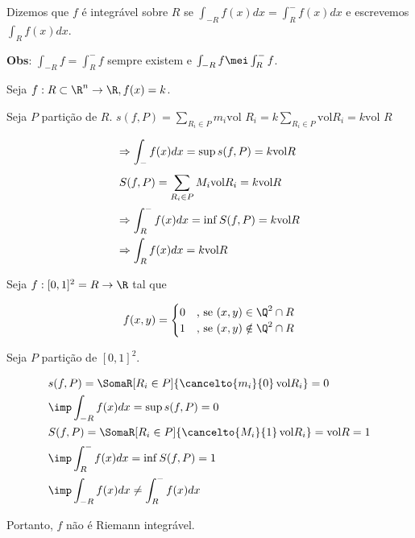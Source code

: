 \documentclass[11pt, oneside, a4paper]{gsm-l}
\begin{document}
Dizemos que $f$ é integrável sobre $R$ se $\int_{-R} {f(x)dx}  = \int_R^ -  {f(x)dx}$ e escrevemos $\int_R f(x) dx$.

\textbf{Obs}: $\int_{-R} f = \int_R^- f$ sempre existem e $\int_{-R} f \mei \int_R^- f$.

\begin{exem}
Seja $f:R \subset \R^n \to \R, f(x) = k$.

Seja $P$ partição de $R$. $s(f,P) = \sum\limits_{R_i \in P}^{} {m_i {\text{vol }}R_i} = k \sum\limits_{R_i \in P}^{} {{\text{vol}}R_i} = k \text{vol } R$

\[
\begin{gathered}
   \Rightarrow \int_ -  {f(x)dx}  = \sup s(f,P) = k{\text{vol}}R \hfill \\
  S(f,P) = \sum\limits_{R_i  \in P}^{} {M_i {\text{vol}}R_i }  = k{\text{vol}}R \hfill \\
   \Rightarrow \int_R^ -  {f(x)dx}  = \inf S(f,P) = k{\text{vol}}R \hfill \\
   \Rightarrow \int_R {f(x)dx}  = k{\text{vol}}R \hfill \\ 
\end{gathered} 
\]

\end{exem}

\begin{exem}
Seja $f:[0,1]^2 = R \to \R$ tal que

\begin{equation*}
  f(x,y) =
  \begin{cases}
    \hfill 0 	& \mbox{, se } (x,y) \in \Q^2 \cap R \\
    \hfill 1 	& \mbox{, se } (x,y) \notin \Q^2 \cap R
  \end{cases}
\end{equation*}

\end{exem}

\begin{sol}
Seja $P$ partição de $[0,1]^2$.

\[
\begin{gathered}
  s(f,P) = \SomaR[R_i \in P]{\mathop {\cancelto{m_i}{0}} \text{vol}R_i} = 0 \hfill \\
  \imp \int_{ - R} {f(x)dx}  = \sup s(f,P) = 0 \hfill \\
  S(f,P) = \SomaR[R_i \in P]{\mathop {\cancelto{M_i}{1}} \text{vol}R_i} = \text{vol}R = 1 \hfill \\
  \imp \int_R^ -  {f(x)dx}  = \inf S(f,P) = 1 \hfill \\
  \imp \int_{ - R} {f(x)dx}  \ne \int_R^ -  {f(x)dx}  \hfill \\ 
\end{gathered} 
\]

Portanto, $f$ não é Riemann integrável.
\end{sol}
\end{document}
